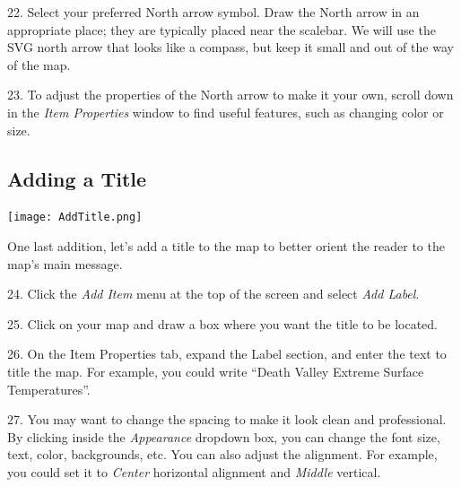 \documentclass[oneside,a4paper,11pt,explicit]{book}
\begin{document}
22. Select your preferred North arrow symbol. Draw the North arrow in an appropriate place; they are typically placed near the scalebar. We will use the SVG north arrow that looks like a compass, but keep it small and out of the way of the map.


23. To adjust the properties of the North arrow to make it your own, scroll down in the \textit{Item Properties} window to find useful features, such as changing color or size. 

\subsection{Adding a Title}

\centerline{\texttt{[image: AddTitle.png]}}

One last addition, let's add a title to the map to better orient the reader to the map's main message. 

24. Click the \textit{Add Item} menu at the top of the screen and select \textit{Add Label}.

25. Click on your map and draw a box where you want the title to be located. 

26. On the Item Properties tab, expand the Label section, and enter the text to title the map. For example, you could write ``Death Valley Extreme Surface Temperatures''.

27. You may want to change the spacing to make it look clean and professional. By clicking inside the \textit{Appearance} dropdown box, you can change the font size, text, color, backgrounds, etc. You can also adjust the alignment. For example, you could set it to \textit{Center} horizontal alignment and \textit{Middle} vertical.
\end{document}
